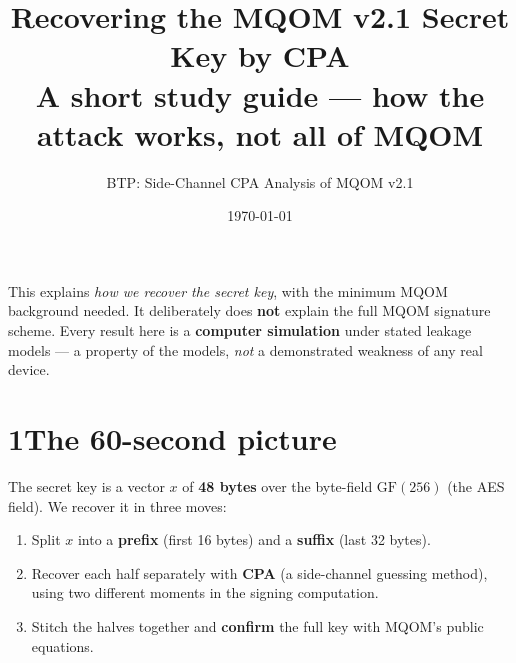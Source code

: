 \documentclass[11pt]{article}
\title{\vspace{-1.2cm}\textbf{Recovering the MQOM v2.1 Secret Key by CPA}\\[2pt]
\large A short study guide --- how the attack works, not all of MQOM}
\author{BTP: Side-Channel CPA Analysis of MQOM v2.1}
\date{\today}
\newcommand{\gf}{\mathrm{GF}(256)}
\begin{document}
\maketitle
\vspace{-0.6cm}

\begin{notebox}
This explains \emph{how we recover the secret key}, with the minimum MQOM background
needed. It deliberately does \textbf{not} explain the full MQOM signature scheme. Every
result here is a \textbf{computer simulation} under stated leakage models --- a property
of the models, \emph{not} a demonstrated weakness of any real device.
\end{notebox}

\section*{1\quad The 60-second picture}
The secret key is a vector $x$ of \textbf{48 bytes} over the byte-field $\gf$ (the AES
field). We recover it in three moves:
\begin{enumerate}
\item Split $x$ into a \textbf{prefix} (first 16 bytes) and a \textbf{suffix} (last 32 bytes).
\item Recover each half separately with \textbf{CPA} (a side-channel guessing method), using
two different moments in the signing computation.
\item Stitch the halves together and \textbf{confirm} the full key with MQOM's public equations.
\end{enumerate}

\begin{center}
\end{center}
\end{document}
